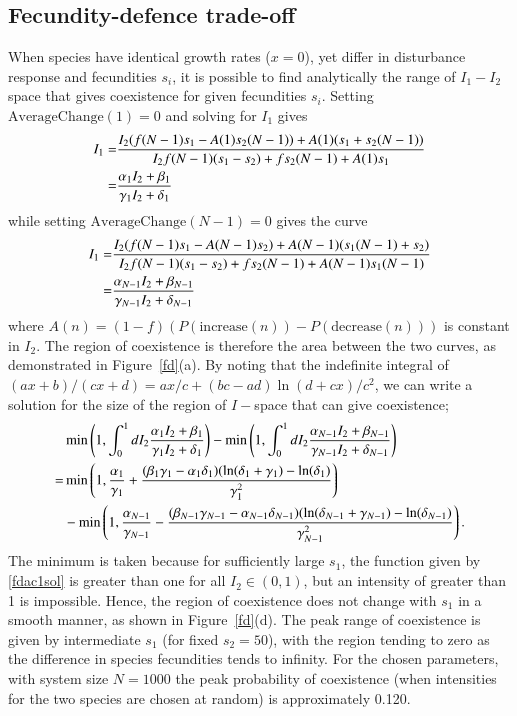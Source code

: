 \subsection{Fecundity-defence trade-off}
When species have identical growth rates ($x=0$), yet differ in disturbance response and fecundities $s_i$, it is possible to find analytically the range of $I_1 - I_2$ space that gives coexistence for given fecundities $s_i$. Setting $\text{AverageChange}(1)=0$ and solving for $I_1$ gives
\begin{align}
\label{fdac1sol}
I_1=&\frac{I_2(f(N-1)s_1-A(1)s_2(N-1)) +A(1)(s_1+s_2(N-1))}{I_2f(N-1)(s_1-s_2) +fs_2(N-1) +A(1)s_1}\notag \\
=&\frac{\alpha_1 I_2 +\beta_1}{\gamma_1 I_2+\delta_1}
\end{align}
while setting $\text{AverageChange}(N-1)=0$ gives the curve
\begin{align}
\label{fdacnsol}
I_1=&\frac{I_2(f(N-1)s_1-A(N-1)s_2) +A(N-1)(s_1(N-1)+s_2)}{I_2f(N-1)(s_1-s_2) +fs_2(N-1) +A(N-1)s_1(N-1)}\notag \\
=&\frac{\alpha_{N-1} I_2 +\beta_{N-1}}{\gamma_{N-1} I_2+\delta_{N-1}}
\end{align}
where $A(n)=(1-f)(P(\text{increase}(n))-P(\text{decrease}(n)))$ is constant in $I_2$. The region of coexistence is therefore the area between the two curves, as demonstrated in Figure~\ref{fd}(a). By noting that the indefinite integral of $(a x +b)/(c x +d) = ax/c+(bc-ad)\ln(d+cx)/c^2$, we can write a solution for the size of the region of $I-$space that can give coexistence;
\begin{align}
&\min \left(1, \int_0^1 dI_2 \frac{\alpha_1 I_2 +\beta_1}{\gamma_1 I_2+\delta_1} \right) - \min \left(1, \int_0^1 dI_2 \frac{\alpha_{N-1} I_2 +\beta_{N-1}}{\gamma_{N-1} I_2+\delta_{N-1}} \right) \notag \\
=&\min\left(1,\frac{\alpha_1}{\gamma_1}+\frac{(\beta_1 \gamma_1 - \alpha_1 \delta_1)(\ln(\delta_1 +\gamma_1)-\ln(\delta_1)}{\gamma_1^2}\right) \\
&-\min \left(1,\frac{\alpha_{N-1}}{\gamma_{N-1}}-\frac{(\beta_{N-1} \gamma_{N-1} - \alpha_{N-1} \delta_{N-1})(\ln(\delta_{N-1} +\gamma_{N-1})-\ln(\delta_{N-1})}{\gamma_{N-1}^2}\right). \notag
\end{align}
The minimum is taken because for sufficiently large $s_1$, the function given by \eqref{fdac1sol} is greater than one for all $I_2 \in (0,1)$, but an intensity of greater than 1 is impossible. Hence, the region of coexistence does not change with $s_1$ in a smooth manner, as shown in Figure~\ref{fd}(d). The peak range of coexistence is given by intermediate $s_1$ (for fixed $s_2=50$), with the region tending to zero as the difference in species fecundities tends to infinity. For the chosen parameters, with system size $N=1000$ the peak probability of coexistence (when intensities for the two species are chosen at random) is approximately 0.120.
